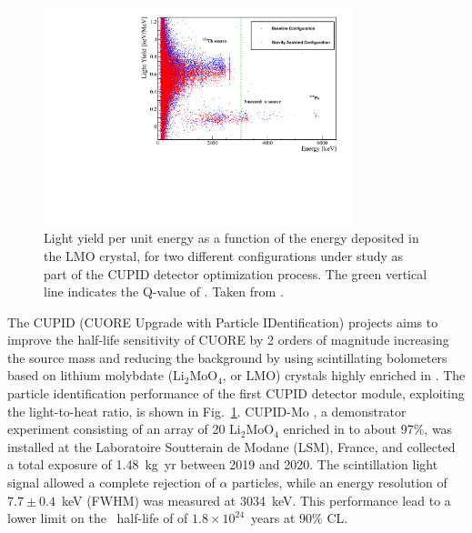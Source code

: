\begin{figure}[t!b!]
\begin{center}
\includegraphics[width=0.8\textwidth]{img/cupid.pdf}
\end{center}
\caption{Light yield per unit energy as a function of the energy deposited in the LMO crystal, for two different configurations under study as part of the CUPID detector optimization process. The green vertical line indicates the Q-value of . Taken from \cite{CUPID:2022opf}.} \label{fig:cupid}
\end{figure}

The CUPID (CUORE Upgrade with Particle IDentification) \cite{CUPID:2019imh} projects aims to improve the half-life sensitivity of CUORE by 2 orders of magnitude increasing the source mass and reducing the background by using scintillating bolometers based on lithium molybdate (Li$_2$MoO$_4$, or LMO) crystals highly enriched in . The particle identification performance of the first CUPID detector module, exploiting the light-to-heat ratio, is shown in Fig.~\ref{fig:cupid}. CUPID-Mo \cite{Augier:2022znx}, a demonstrator experiment consisting of an array of 20 Li$_2$MoO$_4$ enriched in  to about 97\%, was installed at the Laboratoire Soutterain de Modane (LSM), France, and collected a total exposure of 1.48~kg~yr between 2019 and 2020. The scintillation light signal allowed a complete rejection of $\alpha$ particles, while an energy resolution of $7.7\pm0.4$~keV (FWHM) was measured at 3034~keV. This performance lead to a lower limit on the \bbonu\ half-life of  of $1.8\times10^{24}$~years at 90\% CL. 

